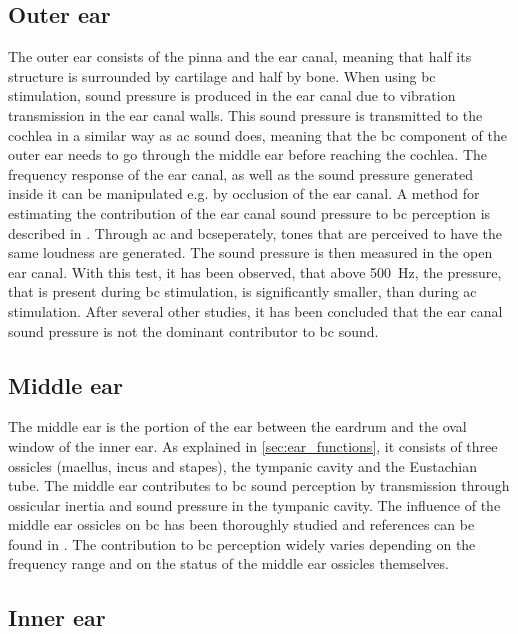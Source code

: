 \subsection*{Outer ear}

The outer ear consists of the pinna and the ear canal, meaning that half its structure is surrounded by cartilage and half by bone. When using \gls{bc} stimulation, sound pressure is produced in the ear canal due to vibration transmission in the ear canal walls. This sound pressure is transmitted to the cochlea in a similar way as \gls{ac} sound does, meaning that the \gls{bc} component of the outer ear needs to go through the middle ear before reaching the cochlea. The frequency response of the ear canal, as well as the sound pressure generated inside it can be manipulated e.g. by occlusion of the ear canal. A method for estimating the contribution of the ear canal sound pressure to \gls{bc} perception is described in \citep{puria_2013}. Through \gls{ac} and \gls{bc}seperately, tones that are perceived to have the same loudness are generated. The sound pressure is then measured in the open ear canal. With this test, it has been observed, that above \SI{500}{\hertz}, the pressure, that is present during \gls{bc} stimulation, is significantly smaller, than during \gls{ac} stimulation. After several other studies, it has been concluded that the ear canal sound pressure is not the dominant contributor to \gls{bc} sound.

\subsection*{Middle ear}

The middle ear is the portion of the ear between the eardrum and the oval window of the inner ear. As explained in \autoref{sec:ear_functions}, it consists of three ossicles (maellus, incus and stapes), the tympanic cavity and the Eustachian tube. The middle ear contributes to \gls{bc} sound perception by transmission through ossicular inertia and sound pressure in the tympanic cavity. The influence of the middle ear ossicles on \gls{bc} has been thoroughly studied and references can be found in \citep[Sec. 6.5]{puria_2013}. The contribution to \gls{bc} perception widely varies depending on the frequency range and on the status of the middle ear ossicles themselves.

\subsection*{Inner ear}


